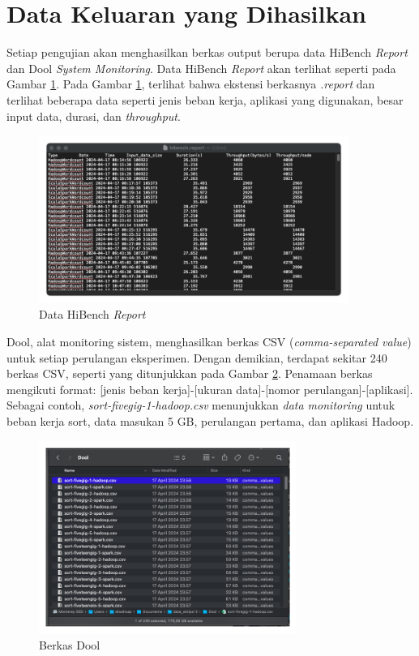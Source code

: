 \section{Data Keluaran yang Dihasilkan}

Setiap pengujian akan menghasilkan berkas output berupa data HiBench \textit{Report} dan Dool \textit{System Monitoring}. Data HiBench \textit{Report} akan terlihat seperti pada Gambar \ref{fig:data-hibench-report}. Pada Gambar \ref{fig:data-hibench-report}, terlihat bahwa ekstensi berkasnya \textit{.report} dan terlihat beberapa data seperti jenis beban kerja, aplikasi yang digunakan, besar input data, durasi, dan \textit{throughput}.

\begin{figure}[h]
    \centering
    \includegraphics[width=0.9\textwidth]{figures/ch04/data-hibench}
    \caption{Data HiBench \textit{Report}}
    \label{fig:data-hibench-report}
\end{figure}

Dool, alat monitoring sistem, menghasilkan berkas CSV (\textit{comma-separated value}) untuk setiap perulangan eksperimen. Dengan demikian, terdapat sekitar 240 berkas CSV, seperti yang ditunjukkan pada Gambar \ref{fig:data-dool-luar}. Penamaan berkas mengikuti format: [jenis beban kerja]-[ukuran data]-[nomor perulangan]-[aplikasi]. Sebagai contoh, \textit{sort-fivegig-1-hadoop.csv} menunjukkan \textit{data monitoring} untuk beban kerja sort, data masukan 5 GB, perulangan pertama, dan aplikasi Hadoop.

\begin{figure}[h]
    \centering
    \includegraphics[width=0.75\textwidth]{figures/ch04/data-dool-luar}
    \caption{Berkas Dool}
    \label{fig:data-dool-luar}
\end{figure}

